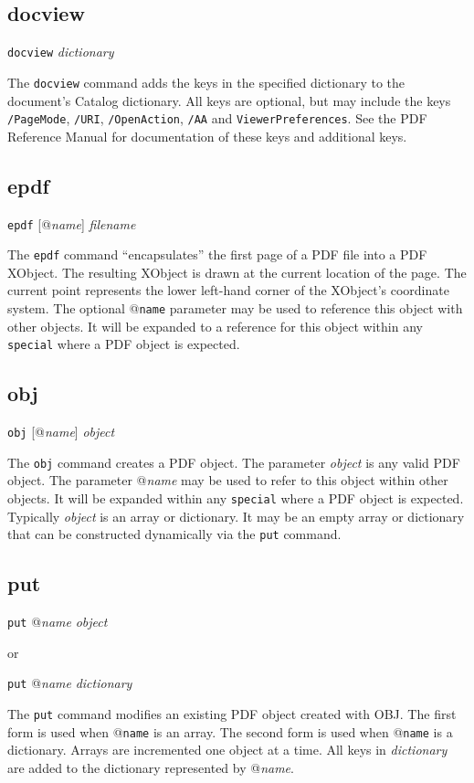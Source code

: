 \subsection{docview}
{\tt docview} {\it dictionary}

The {\tt docview} command adds the keys in the specified dictionary to the
document's Catalog dictionary.  All keys are optional, but may include
the keys {\tt /PageMode},
{\tt /URI}, {\tt /OpenAction}, {\tt /AA}
and {\tt ViewerPreferences}.  See the PDF Reference Manual
for documentation of these keys and additional keys.

\subsection{epdf}

{\tt epdf} [@{\it name}] {\it filename}

The {\tt epdf} command ``encapsulates'' the first page of a PDF
file into a PDF XObject.  The resulting XObject is drawn
at the current location of the page.  The current point
represents the lower left-hand corner of the XObject's coordinate
system.  The optional @{\tt name} parameter may be used
to reference this object with other objects.
It will be expanded to a reference for this object
within any {\tt special} where a PDF object is expected.

\subsection{obj}

{\tt obj} [@{\it name}] {\it object}

The {\tt obj} command creates a
PDF object.  The parameter {\it object} is any valid PDF object.  The parameter @{\it name}
may be used to refer to this object within other objects.
It will be expanded within any {\tt special} where a PDF object is expected.
Typically {\it object} is an array or dictionary.  It may be an empty array or
dictionary that can be constructed dynamically via the {\tt put} command.

\subsection{put}
{\tt put} @{\it name} {\it object}

or 

{\tt put} @{\it name} {\it dictionary}

The {\tt put} command modifies an existing PDF object created with OBJ.
The first form is used when @{\tt name} is an array.  The second
form is used when @{\tt name} is a dictionary.  Arrays are
incremented one object at a time.  All keys in {\it dictionary}
are added to the dictionary represented by @{\it name}.

